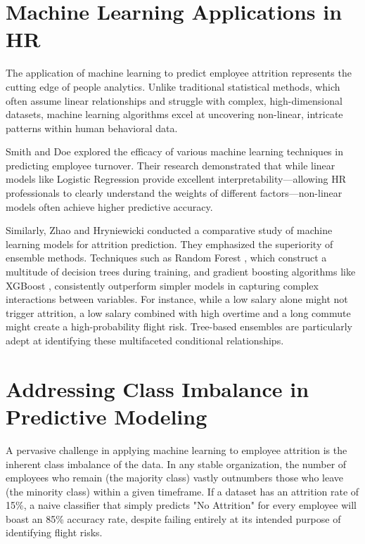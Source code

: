 \section{Machine Learning Applications in HR}
The application of machine learning to predict employee attrition represents the cutting edge of people analytics. Unlike traditional statistical methods, which often assume linear relationships and struggle with complex, high-dimensional datasets, machine learning algorithms excel at uncovering non-linear, intricate patterns within human behavioral data.

Smith and Doe \cite{smith2018predicting} explored the efficacy of various machine learning techniques in predicting employee turnover. Their research demonstrated that while linear models like Logistic Regression provide excellent interpretability—allowing HR professionals to clearly understand the weights of different factors—non-linear models often achieve higher predictive accuracy. 

Similarly, Zhao and Hryniewicki \cite{zhao2019attrition} conducted a comparative study of machine learning models for attrition prediction. They emphasized the superiority of ensemble methods. Techniques such as Random Forest \cite{breiman2001random}, which construct a multitude of decision trees during training, and gradient boosting algorithms like XGBoost \cite{chen2016xgboost}, consistently outperform simpler models in capturing complex interactions between variables. For instance, while a low salary alone might not trigger attrition, a low salary combined with high overtime and a long commute might create a high-probability flight risk. Tree-based ensembles are particularly adept at identifying these multifaceted conditional relationships.

\section{Addressing Class Imbalance in Predictive Modeling}
A pervasive challenge in applying machine learning to employee attrition is the inherent class imbalance of the data. In any stable organization, the number of employees who remain (the majority class) vastly outnumbers those who leave (the minority class) within a given timeframe. If a dataset has an attrition rate of 15\%, a naive classifier that simply predicts "No Attrition" for every employee will boast an 85\% accuracy rate, despite failing entirely at its intended purpose of identifying flight risks.

